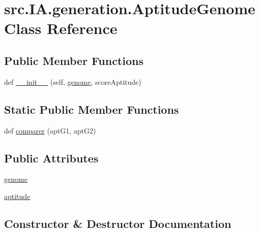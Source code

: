 \hypertarget{classsrc_1_1_i_a_1_1generation_1_1_aptitude_genome}{}\section{src.\+I\+A.\+generation.\+Aptitude\+Genome Class Reference}
\label{classsrc_1_1_i_a_1_1generation_1_1_aptitude_genome}
\subsection*{Public Member Functions}
\begin{DoxyCompactItemize}
\item 
def \hyperlink{classsrc_1_1_i_a_1_1generation_1_1_aptitude_genome_ab8fe94095f2097c8c79eb62ce49720e0}{\+\_\+\+\_\+init\+\_\+\+\_\+} (self, \hyperlink{classsrc_1_1_i_a_1_1generation_1_1_aptitude_genome_adb2ea447f40cd23fa32ac81d0fa0749f}{genome}, score\+Aptitude)
\end{DoxyCompactItemize}
\subsection*{Static Public Member Functions}
\begin{DoxyCompactItemize}
\item 
def \hyperlink{classsrc_1_1_i_a_1_1generation_1_1_aptitude_genome_ac55819705900e2f15f4f064c4a2f3e19}{comparer} (apt\+G1, apt\+G2)
\end{DoxyCompactItemize}
\subsection*{Public Attributes}
\begin{DoxyCompactItemize}
\item 
\hyperlink{classsrc_1_1_i_a_1_1generation_1_1_aptitude_genome_adb2ea447f40cd23fa32ac81d0fa0749f}{genome}
\item 
\hyperlink{classsrc_1_1_i_a_1_1generation_1_1_aptitude_genome_a47dd54ce79c4991802651a85dc4c35e3}{aptitude}
\end{DoxyCompactItemize}


\subsection{Constructor \& Destructor Documentation}
\mbox{\label{classsrc_1_1_i_a_1_1generation_1_1_aptitude_genome_ab8fe94095f2097c8c79eb62ce49720e0}} 
